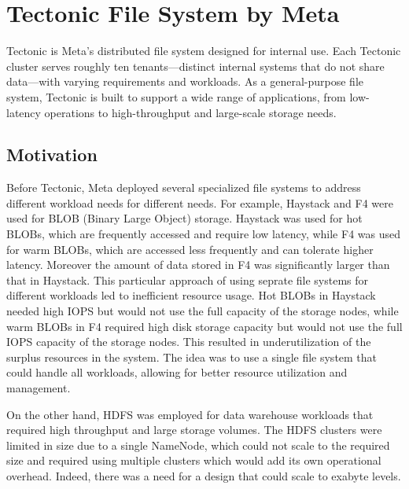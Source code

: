 \chapter{Tectonic File System by Meta}\label{chap:tectonic}

Tectonic\cite{tectonic} is Meta's distributed file system designed for internal use. Each Tectonic cluster serves roughly ten tenants—distinct internal systems that do not share data—with varying requirements and workloads. As a general-purpose file system, Tectonic is built to support a wide range of applications, from low-latency operations to high-throughput and large-scale storage needs.

\section{Motivation}\label{sec:tectonic_motivation}
Before Tectonic, Meta deployed several specialized file systems to address different workload needs for different needs. For example, Haystack\cite{haystack} and F4\cite{f4} were used for BLOB (Binary Large Object) storage. Haystack was used for hot BLOBs, which are frequently accessed and require low latency, while F4 was used for warm BLOBs, which are accessed less frequently and can tolerate higher latency. Moreover the amount of data stored in F4 was significantly larger than that in Haystack. This particular approach of using seprate file systems for different workloads led to inefficient resource usage. Hot BLOBs in Haystack needed high IOPS but would not use the full capacity of the storage nodes, while warm BLOBs in F4 required high disk storage capacity but would not use the full IOPS capacity of the storage nodes. This resulted in underutilization of the surplus resources in the system. The idea was to use a single file system that could handle all workloads, allowing for better resource utilization and management.

On the other hand, HDFS\cite{hdfs} was employed for data warehouse workloads that required high throughput and large storage volumes. The HDFS clusters were limited in size due to a single NameNode, which could not scale to the required size and required using multiple clusters which would add its own operational overhead. Indeed, there was a need for a design that could scale to exabyte levels.

